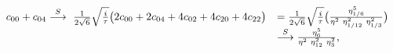 \begin{equation}
  \begin{array}{rl}
    c_{00} +c_{04} \stackrel{S}{\longrightarrow} ~{1\over
    2\sqrt{6}}\sqrt{i\over\tau}\big( 2c_{00} +2c_{04} +4c_{02} +
    4c_{20} +4c_{22} \big) &= {1\over
    2\sqrt{6}}\sqrt{i\over\tau}\big( {\eta_{1/6}^5 \over
    \eta^2 ~\eta_{1/12}^2 ~\eta_{1/3}^2} \big)\\
    & \stackrel{S}{\longrightarrow} 
    {\eta_{6}^5 \over \eta^2 ~\eta_{12}^2 ~\eta_{3}^2 },
  \end{array}
\end{equation}

